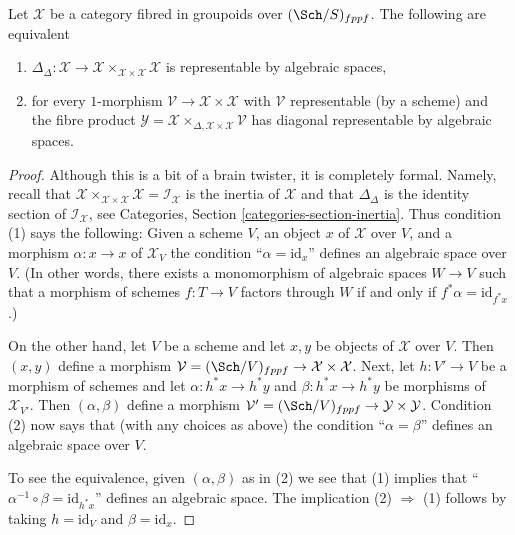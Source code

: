 \begin{lemma}
\label{lemma-second-diagonal}
Let $\mathcal{X}$ be a category fibred in groupoids over $(\Sch/S)_{fppf}$.
The following are equivalent
\begin{enumerate}
\item $\Delta_\Delta : \mathcal{X} \to
\mathcal{X} \times_{\mathcal{X} \times \mathcal{X}} \mathcal{X}$
is representable by algebraic spaces,
\item for every $1$-morphism $\mathcal{V} \to \mathcal{X} \times \mathcal{X}$
with $\mathcal{V}$ representable (by a scheme) and the fibre product
$\mathcal{Y} =
\mathcal{X} \times_{\Delta, \mathcal{X} \times \mathcal{X}} \mathcal{V}$
has diagonal representable by algebraic spaces.
\end{enumerate}
\end{lemma}

\begin{proof}
Although this is a bit of a brain twister, it is completely formal.
Namely, recall that
$\mathcal{X} \times_{\mathcal{X} \times \mathcal{X}} \mathcal{X} =
\mathcal{I}_\mathcal{X}$ is the inertia of $\mathcal{X}$ and that
$\Delta_\Delta$ is the identity section of $\mathcal{I}_\mathcal{X}$, see
Categories, Section \ref{categories-section-inertia}.
Thus condition (1) says the following: Given a scheme $V$, an object $x$ of
$\mathcal{X}$ over $V$, and a morphism $\alpha : x \to x$ of $\mathcal{X}_V$
the condition ``$\alpha = \text{id}_x$'' defines an algebraic space over $V$.
(In other words, there exists a monomorphism of algebraic spaces $W \to V$
such that a morphism of schemes $f : T \to V$ factors through $W$
if and only if $f^*\alpha = \text{id}_{f^*x}$.)

\medskip\noindent
On the other hand, let $V$ be a scheme and let $x, y$ be objects of
$\mathcal{X}$ over $V$. Then $(x, y)$ define a morphism
$\mathcal{V} = (\Sch/V)_{fppf} \to \mathcal{X} \times \mathcal{X}$.
Next, let $h : V' \to V$ be a morphism of schemes and let
$\alpha : h^*x \to h^*y$ and $\beta : h^*x \to h^*y$ be morphisms
of $\mathcal{X}_{V'}$. Then $(\alpha, \beta)$ define a morphism
$\mathcal{V}' = (\Sch/V)_{fppf} \to \mathcal{Y} \times \mathcal{Y}$.
Condition (2) now says that (with any choices as above) the
condition ``$\alpha = \beta$'' defines an algebraic space over $V$.

\medskip\noindent
To see the equivalence, given $(\alpha, \beta)$ as in (2) we see that
(1) implies that ``$\alpha^{-1} \circ \beta = \text{id}_{h^*x}$''
defines an algebraic space. The implication (2) $\Rightarrow$ (1)
follows by taking $h = \text{id}_V$ and $\beta = \text{id}_x$.
\end{proof}











